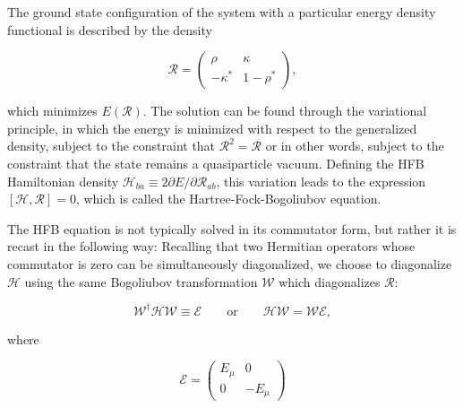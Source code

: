 The ground state configuration of the system with a particular energy density functional is described by the density

\begin{equation}
\mathcal{R} = \left(\begin{array}{cc}
\rho & \kappa \\
-\kappa^* & 1-\rho^*
\end{array}\right),
\end{equation}

\noindent which minimizes $E(\mathcal{R})$. The solution can be found through the variational principle, in which the energy is minimized with respect to the generalized density, subject to the constraint that $\mathcal{R}^2=\mathcal{R}$ \textminus or in other words, subject to the constraint that the state remains a quasiparticle vacuum. Defining the HFB Hamiltonian density $\mathcal{H}_{ba} \equiv 2 \partial E/\partial \mathcal{R}_{ab}$, this variation leads to the expression $\left[\mathcal{H},\mathcal{R}\right]=0$, which is called the Hartree-Fock-Bogoliubov equation.

The HFB equation is not typically solved in its commutator form, but rather it is recast in the following way: Recalling that two Hermitian operators whose commutator is zero can be simultaneously diagonalized, we choose to diagonalize $\mathcal{H}$ using the same Bogoliubov transformation $\mathcal{W}$ which diagonalizes $\mathcal{R}$:

\begin{equation}
\mathcal{W}^\dagger \mathcal{H} \mathcal{W} \equiv \mathcal{E} \qquad\mathrm{or}\qquad \mathcal{H}\mathcal{W} = \mathcal{W}\mathcal{E},
\end{equation}

\noindent where

\begin{equation}
\mathcal{E} = \left(\begin{array}{cc}
E_\mu & 0 \\
0 & -E_\mu
\end{array}\right)
\end{equation}


